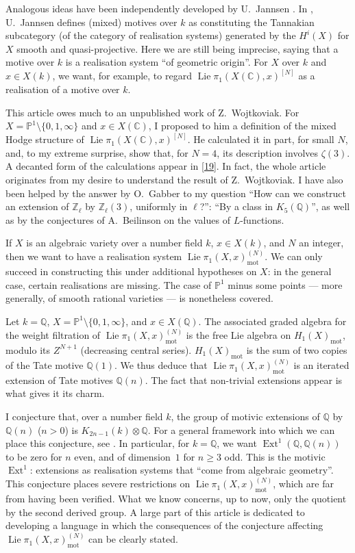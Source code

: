 \documentclass{article}
\theoremstyle{definition}
\newcommand{\mot}{\mathrm{mot}}
\newcommand{\bb}{\mathbb}
\newcommand{\PP}{\bb{P}}
\newcommand{\ZZ}{\bb{Z}}
\newcommand{\CC}{\bb{C}}
\newcommand{\QQ}{\bb{Q}}
\renewcommand{\geq}{\geqslant}
\DeclareMathOperator{\Lie}{Lie}
\DeclareMathOperator{\Ext}{Ext}
\newcommand{\oldpage}[1]{\marginpar{\footnotesize$\Big\vert$ \textit{p.~#1}}}
\begin{document}
Analogous ideas have been independently developed by U.~Jannsen \cite{J}.
In \cite{J}, U.~Jannsen defines (mixed) motives over $k$ as constituting the Tannakian subcategory (of the category of realisation systems) generated by the $H^i(X)$ for $X$ smooth and quasi-projective.
Here we are still being imprecise, saying that a motive over $k$ is a realisation system ``of geometric origin''.
For $X$ over $k$ and $x\in X(k)$, we want, for example, to regard $\Lie\pi_1(X(\CC),x)^{[N]}$ as a realisation of a motive over $k$.

This article owes much to an unpublished work of Z.~Wojtkoviak.
For $X=\PP^1\setminus\{0,1,\infty\}$ and $x\in X(\CC)$, I proposed to him a definition of the mixed Hodge structure of $\Lie\pi_1(X(\CC),x)^{[N]}$.
He calculated it in part, for small $N$, and, to my extreme surprise, show that, for $N=4$, its description involves $\zeta(3)$.
A decanted form of the calculations appear in \cref{19}.
In fact, the whole article originates from my desire to
\oldpage{83}
understand the result of Z.~Wojtkoviak.
I have also been helped by the answer by O.~Gabber to my question ``How can we construct an extension of $\ZZ_\ell$ by $\ZZ_\ell(3)$, uniformly in $\ell$?'': ``By a class in $K_5(\QQ)$'', as well as by the conjectures of A.~Beilinson on the values of $L$-functions.

If $X$ is an algebraic variety over a number field $k$, $x\in X(k)$, and $N$ an integer, then we want to have a realisation system $\Lie\pi_1(X,x)_\mot^{(N)}$.
We can only succeed in constructing this under additional hypotheses on $X$: in the general case, certain realisations are missing.
The case of $\PP^1$ minus some points --- more generally, of smooth rational varieties --- is nonetheless covered.

Let $k=\QQ$, $X=\PP^1\setminus\{0,1,\infty\}$, and $x\in X(\QQ)$.
The associated graded algebra for the weight filtration of $\Lie\pi_1(X,x)_\mot^{(N)}$ is the free Lie algebra on $H_1(X)_\mot$, modulo its $Z^{N+1}$ (decreasing central series).
$H_1(X)_\mot$ is the sum of two copies of the Tate motive $\QQ(1)$.
We thus deduce that $\Lie\pi_1(X,x)_\mot^{(N)}$ is an iterated extension of Tate motives $\QQ(n)$.
The fact that non-trivial extensions appear is what gives it its charm.

I conjecture that, over a number field $k$, the group of motivic extensions of $\QQ$ by $\QQ(n)$ ($n>0$) is $K_{2n-1}(k)\otimes\QQ$.
For a general framework into which we can place this conjecture, see \cite[§5]{B}.
In particular, for $k=\QQ$, we want $\Ext^1(\QQ,\QQ(n))$ to be zero for $n$ even, and of dimension~$1$ for $n\geq3$ odd.
This is the motivic $\Ext^1$: extensions as realisation systems that ``come from algebraic geometry''.
This conjecture places severe restrictions on $\Lie\pi_1(X,x)_\mot^{(N)}$, which are far from having been verified.
What we know concerns, up to now, only the quotient by the second derived group.
A large part of this article is dedicated to developing a language in which the consequences of the conjecture affecting $\Lie\pi_1(X,x)_\mot^{(N)}$ can be clearly stated.
\end{document}

